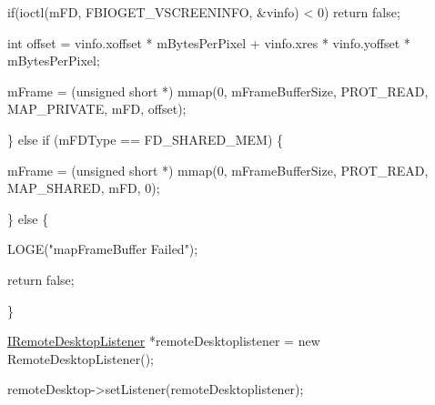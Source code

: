 \begin{DoxyPre}		 if(ioctl(mFD, FBIOGET\_VSCREENINFO, &vinfo) < 0) return false;\end{DoxyPre}



\begin{DoxyPre}		 int offset = vinfo.xoffset * mBytesPerPixel + vinfo.xres * vinfo.yoffset * mBytesPerPixel;\end{DoxyPre}



\begin{DoxyPre}		 mFrame = (unsigned short *) mmap(0, mFrameBufferSize, PROT\_READ, MAP\_PRIVATE, mFD, offset);\end{DoxyPre}



\begin{DoxyPre}	 \} else if (mFDType == FD\_SHARED\_MEM) \{\end{DoxyPre}



\begin{DoxyPre}		 mFrame = (unsigned short *) mmap(0, mFrameBufferSize, PROT\_READ, MAP\_SHARED, mFD, 0);\end{DoxyPre}



\begin{DoxyPre}	 \} else \{\end{DoxyPre}



\begin{DoxyPre}		 LOGE("mapFrameBuffer Failed");\end{DoxyPre}



\begin{DoxyPre}		 return false;\end{DoxyPre}



\begin{DoxyPre}	 \}\end{DoxyPre}



\begin{DoxyPre}	 \hyperlink{classknoxremotedesktop_1_1IRemoteDesktopListener}{IRemoteDesktopListener} *remoteDesktoplistener = new RemoteDesktopListener();\end{DoxyPre}



\begin{DoxyPre}	 remoteDesktop->setListener(remoteDesktoplistener);\end{DoxyPre}



